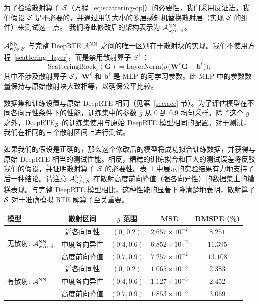 为了检验散射算子 $\mathcal{S}$（方程~\ref{eq:scattering-op}）的必要性，我们采用反证法。我们假设 $\mathcal{S}$ 是不必要的，并通过用等大小的多层感知机替换散射层（实现 $\mathcal{S}$ 的组件）来测试这一点。
我们将此修改后的架构表示为 $\mathcal{A}^{\text{NN}}_{\text{w/o }\mathcal{S}}$。

$\mathcal{A}^{\text{NN}}_{\text{w/o }\mathcal{S}}$ 与完整 DeepRTE $\mathcal{A}^{\text{NN}}$ 之间的唯一区别在于散射块的实现。我们不使用方程~\ref{scattering_layer}，而是禁用散射算子 $S^\top$：
\begin{equation}
    \text{ScatteringBlock}_\ell(\bm{G}) = \text{LayerNorm}\Big(\sigma\Big(\bm{W}^{\ell} \bm{G} + \bm{b}^{\ell}\Big)\Big),
\end{equation}
其中不涉及散射算子 $\mathcal{S}$，$\bm{W}^{\ell}$ 和 $\bm{b}^{\ell}$ 是 MLP 的可学习参数。此 MLP 中的参数数量保持与原始散射块大致相等，以确保公平比较。

数据集和训练设置与原始 DeepRTE 相同（见第~\ref{sec:acc} 节）。为了评估模型在不同各向异性条件下的性能，训练集中的参数 $g$ 从 $0$ 到 $0.9$ 均匀采样。除了这个 $g$ 之外，$\text{DeepRTE}_{\mathcal{S}}$ 的训练集使用与原始 DeepRTE 模型相同的配置。对于测试，我们在相同的三个散射区间上进行测试。

如果我们的假设是正确的，那么这个修改后的模型将成功拟合训练数据，并获得与原始 DeepRTE 相当的测试性能。相反，糟糕的训练拟合和巨大的测试误差将反驳我们的假设，并证明散射算子 $\mathcal{S}$ 的必要性。表~\ref{tab:ablation_g} 中展示的实验结果有力地支持了后一种结论。请注意 $\mathcal{A}^{\text{NN}}_{\text{w/o }\mathcal{S}}$ 在散射高度前向峰值（强各向异性）的数据集上的糟糕表现。与完整 DeepRTE 模型相比，这种性能的显著下降清楚地表明，散射算子 $\mathcal{S}$ 对于准确模拟 RTE 解算子至关重要。
\begin{table}[htbp]
    \centering
    \begin{tabular}{@{}lcccc@{}}
        \toprule
        模型                                            & 散射区间   & $g$ 范围      & MSE                    & RMSPE (\%) \\
        \midrule
        \multirow{3}{*}{无散射: $\mathcal{A}^{\text{NN}}_{\text{w/o }\mathcal{S}}$} & 近各向同性  & $(0,\,0.2)$ & $2.657\times10^{-2}$   & $8.251$    \\
                                                      & 中度各向异性 & $(0.4,0.6)$ & $6.852\times10^{-2}$   & $11.395$   \\
                                                      & 高度前向峰值 & $(0.7,0.9)$ & $7.257\times10^{-2}$   & $13.108$   \\
        \midrule
        \multirow{3}{*}{有散射: $\mathcal{A}^{\text{NN}}$}                  & 近各向同性  & $(0,\,0.2)$ & $1.065 \times 10^{-3}$ & 2.383      \\
                                                      & 中度各向异性 & $(0.4,0.6)$ & $1.127 \times 10^{-3}$ & 2.452      \\
                                                      & 高度前向峰值 & $(0.7,0.9)$ & $1.853 \times 10^{-3}$ & 3.069      \\
        \bottomrule
    \end{tabular}
    \label{tab:ablation_g}
\end{table}

